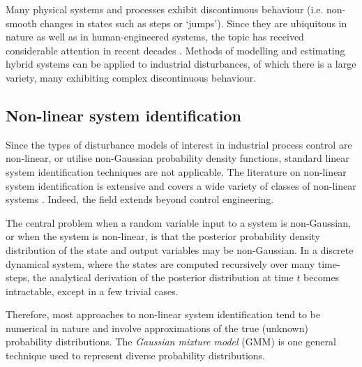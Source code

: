 Many physical systems and processes exhibit discontinuous behaviour (i.e. non-smooth changes in states such as steps or ‘jumps’). Since they are ubiquitous in nature as well as in human-engineered systems, the topic has received considerable attention in recent decades \citep{sworder_boyd_1999, bemporad_identification_2001, costa_discrete-time_2005, camacho_model_2010, djemai_hybrid_2014, estrada_hybrid_2014, guo_moving_2013, botha_hybrid_2018, bemporad_fitting_2018, oliveira_iterative_2020, piga_estimation_2020}. Methods of modelling and estimating hybrid systems can be applied to industrial disturbances, of which there is a large variety, many exhibiting complex discontinuous behaviour.

\subsection{Non-linear system identification}

Since the types of disturbance models of interest in industrial process control are non-linear, or utilise non-Gaussian probability density functions, standard linear system identification techniques are not applicable. The literature on non-linear system identification is extensive and covers a wide variety of classes of non-linear systems \citep{schoukens_nonlinear_2019}. Indeed, the field extends beyond control engineering.


The central problem when a random variable input to a system is non-Gaussian, or when the system is non-linear, is that the posterior probability density distribution of the state and output variables may be non-Gaussian. In a discrete dynamical system, where the states are computed recursively over many time-steps, the analytical derivation of the posterior distribution at time $t$ becomes intractable, except in a few trivial cases.

Therefore, most approaches to non-linear system identification tend to be numerical in nature and involve approximations of the true (unknown) probability distributions. The \textit{Gaussian mixture model} (\gls{GMM}) is one general technique used to represent diverse probability distributions.

